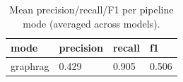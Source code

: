 \begin{table}[ht]
\centering
\caption{Mean precision/recall/F1 per pipeline mode (averaged across models).}
\label{tab:per_mode}
\begin{tabular}{llll}
\toprule
mode & precision & recall & f1 \\
\midrule
graphrag & 0.429 & 0.905 & 0.506 \\
\bottomrule
\end{tabular}
\end{table}
